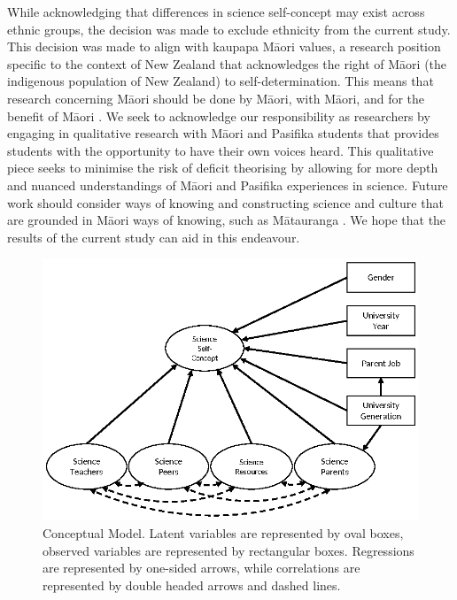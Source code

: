 \documentclass[smallextended]{svjour3}       %
\begin{document}
While acknowledging that differences in science self-concept may exist across ethnic groups, the decision was made to exclude ethnicity from the current study. This decision was made to align with kaupapa M\={a}ori values, a research position specific to the context of New Zealand that acknowledges the right of M\={a}ori (the indigenous population of New Zealand) to self-determination. This means that research concerning M\={a}ori should be done by M\={a}ori, with M\={a}ori, and for the benefit of M\={a}ori \cite{walker2006exploration}. We seek to acknowledge our responsibility as researchers by engaging in qualitative research with M\={a}ori and Pasifika students that provides students with the opportunity to have their own voices heard. This qualitative piece seeks to minimise the risk of deficit theorising by allowing for more depth and nuanced understandings of M\={a}ori and Pasifika experiences in science. Future work should consider ways of knowing and constructing science and culture that are grounded in M\={a}ori ways of knowing, such as M\={a}tauranga \cite{hikuroa2017matauranga}. We hope that the results of the current study can aid in this endeavour. 
\begin{figure}
 \includegraphics{ConceptualModel.eps}
\caption{Conceptual Model. Latent variables are represented by oval boxes, observed variables are represented by rectangular boxes. Regressions are represented by one-sided arrows, while correlations are represented by double headed arrows and dashed lines. }
\label{fig:1}       
\end{figure}
\end{document}
